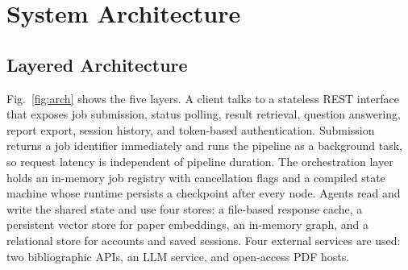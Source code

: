 \documentclass[conference]{IEEEtran}
\begin{document}
\section{System Architecture}
\label{sec:arch}

\subsection{Layered Architecture}
Fig.~\ref{fig:arch} shows the five layers. A client talks to a stateless REST interface that exposes job submission, status polling, result retrieval, question answering, report export, session history, and token-based authentication. Submission returns a job identifier immediately and runs the pipeline as a background task, so request latency is independent of pipeline duration. The orchestration layer holds an in-memory job registry with cancellation flags and a compiled state machine whose runtime persists a checkpoint after every node. Agents read and write the shared state and use four stores: a file-based response cache, a persistent vector store for paper embeddings, an in-memory graph, and a relational store for accounts and saved sessions. Four external services are used: two bibliographic APIs, an LLM service, and open-access PDF hosts.
\end{document}
